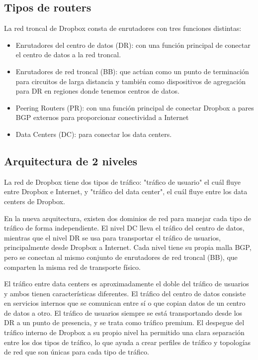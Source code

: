 \subsection{Tipos de routers}
La red troncal de Dropbox consta de enrutadores con tres funciones distintas:
\begin{itemize}
\item Enrutadores del centro de datos (DR): con una función principal de conectar el centro de datos a la red troncal.
\item Enrutadores de red troncal (BB): que actúan como un punto de terminación para circuitos de larga distancia y también como dispositivos de agregación para DR en regiones donde tenemos centros de datos.
\item Peering Routers (PR): con una función principal de conectar Dropbox a pares BGP externos para proporcionar conectividad a Internet
\item Data Centers (DC): para conectar los data centers.
\end{itemize}

\subsection{Arquitectura de 2 niveles}

La red de Dropbox tiene dos tipos de tráfico: "tráfico de usuario" el cuál fluye entre Dropbox e Internet, y "tráfico del data center", el cuál fluye entre los data centers de Dropbox.

En la nueva arquitectura, existen dos dominios de red para manejar cada tipo de tráfico de forma independiente. El nivel DC lleva el tráfico del centro de datos, mientras que el nivel DR se usa para transportar el tráfico de usuarios, principalmente desde Dropbox a Internet. Cada nivel tiene su propia malla BGP, pero se conectan al mismo conjunto de enrutadores de red troncal (BB), que comparten la misma red de transporte físico.

El tráfico entre data centers es aproximadamente el doble del tráfico de usuarios y ambos tienen características diferentes. El tráfico del centro de datos consiste en servicios internos que se comunican entre sí o que copian datos de un centro de datos a otro. El tráfico de usuarios siempre se está transportando desde los DR a un punto de presencia, y se trata como tráfico premium. El despegue del tráfico interno de Dropbox a su propio nivel ha permitido una clara separación entre los dos tipos de tráfico, lo que ayuda a crear perfiles de tráfico y topologías de red que son únicas para cada tipo de tráfico.

